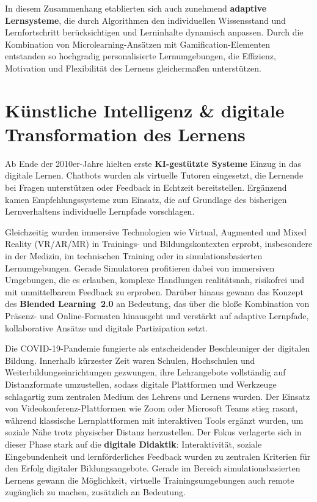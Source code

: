 In diesem Zusammenhang etablierten sich auch zunehmend \textbf{adaptive Lernsysteme}, die durch Algorithmen den individuellen Wissensstand und Lernfortschritt berücksichtigen und Lerninhalte dynamisch anpassen. Durch die Kombination von Microlearning-Ansätzen mit Gamification-Elementen entstanden so hochgradig personalisierte Lernumgebungen, die Effizienz, Motivation und Flexibilität des Lernens gleichermaßen unterstützen.\parencite[S.~1f]{katsaris_adaptive_2021}

\section{Künstliche Intelligenz \& digitale Transformation des Lernens}

Ab Ende der 2010er-Jahre hielten erste \textbf{KI-gestützte Systeme} Einzug in das digitale Lernen. Chatbots wurden als virtuelle Tutoren eingesetzt, die Lernende bei Fragen unterstützen oder Feedback in Echtzeit bereitstellen. Ergänzend kamen Empfehlungssysteme zum Einsatz, die auf Grundlage des bisherigen Lernverhaltens individuelle Lernpfade vorschlagen.\parencite[S.~1f]{harry_role_2023,zhai_review_2021}

Gleichzeitig wurden immersive Technologien wie Virtual, Augmented und Mixed Reality (VR/AR/MR) in Trainings- und Bildungskontexten erprobt, insbesondere in der Medizin, im technischen Training oder in simulationsbasierten Lernumgebungen.\parencite[S.~3f]{rocha_bicalho_use_2023,anatolevna_kastornova_international_2022,radianti_systematic_2020} Gerade Simulatoren profitieren dabei von immersiven Umgebungen, die es erlauben, komplexe Handlungen realitätsnah, risikofrei und mit unmittelbarem Feedback zu erproben. Darüber hinaus gewann das Konzept des \textbf{Blended Learning~2.0} an Bedeutung, das über die bloße Kombination von Präsenz- und Online-Formaten hinausgeht und verstärkt auf adaptive Lernpfade, kollaborative Ansätze und digitale Partizipation setzt.\parencite{seufert_schulleitertagung_2014,news_aktuell_gmbh_e-learning_2025}

Die COVID-19-Pandemie fungierte als entscheidender Beschleuniger der digitalen Bildung. Innerhalb kürzester Zeit waren Schulen, Hochschulen und Weiterbildungseinrichtungen gezwungen, ihre Lehrangebote vollständig auf Distanzformate umzustellen, sodass digitale Plattformen und Werkzeuge schlagartig zum zentralen Medium des Lehrens und Lernens wurden. Der Einsatz von Videokonferenz-Plattformen wie Zoom oder Microsoft Teams stieg rasant, während klassische Lernplattformen mit interaktiven Tools ergänzt wurden, um soziale Nähe trotz physischer Distanz herzustellen.\parencite[S.~1f]{hodges_torrey_2020} Der Fokus verlagerte sich in dieser Phase stark auf die \textbf{digitale Didaktik}: Interaktivität, soziale Eingebundenheit und lernförderliches Feedback wurden zu zentralen Kriterien für den Erfolg digitaler Bildungsangebote. Gerade im Bereich simulationsbasierten Lernens gewann die Möglichkeit, virtuelle Trainingsumgebungen auch remote zugänglich zu machen, zusätzlich an Bedeutung.

